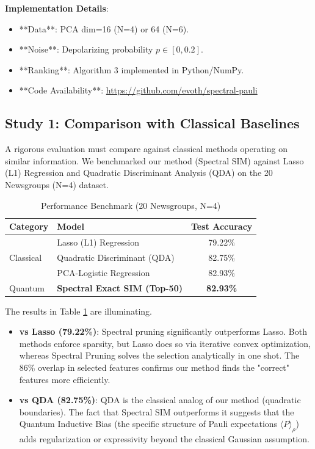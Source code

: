\documentclass[conference]{IEEEtran}
\begin{document}
\textbf{Implementation Details}: 
\begin{itemize}
    \item **Data**: PCA dim=16 (N=4) or 64 (N=6).
    \item **Noise**: Depolarizing probability $p \in [0, 0.2]$.
    \item **Ranking**: Algorithm 3 implemented in Python/NumPy.
    \item **Code Availability**: \url{https://github.com/evoth/spectral-pauli}
\end{itemize}

\subsection{Study 1: Comparison with Classical Baselines}
A rigorous evaluation must compare against classical methods operating on similar information. We benchmarked our method (Spectral SIM) against Lasso (L1) Regression and Quadratic Discriminant Analysis (QDA) on the 20 Newsgroups (N=4) dataset.

\begin{table}[h]
    \centering
    \caption{Performance Benchmark (20 Newsgroups, N=4)}
    \begin{tabular}{llc}
        \hline
        Category & Model & Test Accuracy \\
        \hline
        \multirow{3}{*}{Classical} & Lasso (L1) Regression & 79.22\% \\
        & Quadratic Discriminant (QDA) & 82.75\% \\
        & PCA-Logistic Regression & 82.93\% \\
        \hline
        \multirow{1}{*}{Quantum} & \textbf{Spectral Exact SIM (Top-50)} & \textbf{82.93\%} \\
        \hline
    \end{tabular}
    \label{tab:baselines}
\end{table}

The results in Table \ref{tab:baselines} are illuminating.
\begin{itemize}
    \item \textbf{vs Lasso (79.22\%)}: Spectral pruning significantly outperforms Lasso. Both methods enforce sparsity, but Lasso does so via iterative convex optimization, whereas Spectral Pruning solves the selection analytically in one shot. The 86\% overlap in selected features confirms our method finds the "correct" features more efficiently.
    \item \textbf{vs QDA (82.75\%)}: QDA is the classical analog of our method (quadratic boundaries). The fact that Spectral SIM outperforms it suggests that the Quantum Inductive Bias (the specific structure of Pauli expectations $\langle P \rangle_{\rho}$) adds regularization or expressivity beyond the classical Gaussian assumption.
\end{itemize}
\end{document}
